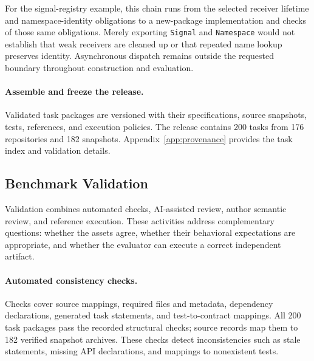 \documentclass[acmsmall,screen,review,anonymous,nonacm]{acmart}
\begin{document}
For the signal-registry example, this chain runs from the selected receiver
lifetime and namespace-identity obligations to a new-package implementation
and checks of those same obligations. Merely exporting \texttt{Signal} and
\texttt{Namespace} would not establish that weak receivers are cleaned up or
that repeated name lookup preserves identity. Asynchronous dispatch remains
outside the requested boundary throughout construction and evaluation.

\paragraph{Assemble and freeze the release.}
Validated task packages are versioned with their specifications, source
snapshots, tests, references, and execution policies. The release contains
200 tasks from 176 repositories and 182 snapshots. Appendix~\ref{app:provenance}
provides the task index and validation details.

\subsection{Benchmark Validation}
\label{sec:validation}

Validation combines automated checks, AI-assisted review, author semantic
review, and reference execution. These activities address complementary
questions: whether the assets agree, whether their behavioral expectations are
appropriate, and whether the evaluator can execute a correct independent artifact.

\paragraph{Automated consistency checks.}
Checks cover source mappings, required files and metadata, dependency declarations,
generated task statements, and test-to-contract mappings. All 200 task packages
pass the recorded structural checks; source records map them to 182 verified
snapshot archives. These checks detect inconsistencies such as stale statements,
missing API declarations, and mappings to nonexistent tests.
\end{document}
